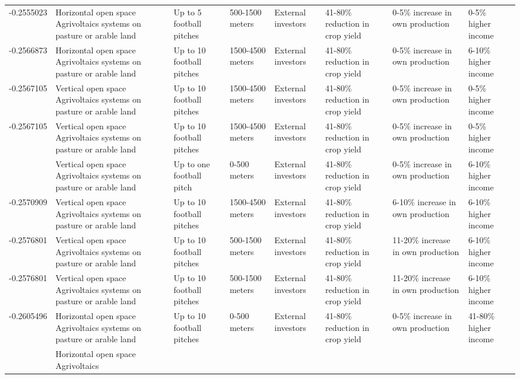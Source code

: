 \begin{table}
\begin{tabular}[t]{rlllllll}
-0.2555023 & Horizontal open space Agrivoltaics
systems on pasture or arable land & Up to 5 football pitches & 500-1500 meters & External investors & 41-80\% reduction in crop yield & 0-5\% increase in own production & 0-5\% higher income\\
-0.2566873 & Horizontal open space Agrivoltaics
systems on pasture or arable land & Up to 10 football pitches & 1500-4500 meters & External investors & 41-80\% reduction in crop yield & 0-5\% increase in own production & 6-10\% higher income\\
-0.2567105 & Vertical open space Agrivoltaics
systems on pasture or arable land & Up to 10 football pitches & 1500-4500 meters & External investors & 41-80\% reduction in crop yield & 0-5\% increase in own production & 0-5\% higher income\\
-0.2567105 & Vertical open space Agrivoltaics
systems on pasture or arable land & Up to 10 football pitches & 1500-4500 meters & External investors & 41-80\% reduction in crop yield & 0-5\% increase in own production & 0-5\% higher income\\
\addlinespace
-0.2570597 & Vertical open space Agrivoltaics
systems on pasture or arable land & Up to one football pitch & 0-500 meters & External investors & 41-80\% reduction in crop yield & 0-5\% increase in own production & 6-10\% higher income\\
-0.2570909 & Vertical open space Agrivoltaics
systems on pasture or arable land & Up to 10 football pitches & 1500-4500 meters & External investors & 41-80\% reduction in crop yield & 6-10\% increase in own production & 6-10\% higher income\\
-0.2576801 & Vertical open space Agrivoltaics
systems on pasture or arable land & Up to 10 football pitches & 500-1500 meters & External investors & 41-80\% reduction in crop yield & 11-20\% increase in own production & 6-10\% higher income\\
-0.2576801 & Vertical open space Agrivoltaics
systems on pasture or arable land & Up to 10 football pitches & 500-1500 meters & External investors & 41-80\% reduction in crop yield & 11-20\% increase in own production & 6-10\% higher income\\
-0.2605496 & Horizontal open space Agrivoltaics
systems on pasture or arable land & Up to 10 football pitches & 0-500 meters & External investors & 41-80\% reduction in crop yield & 0-5\% increase in own production & 41-80\% higher income\\
\addlinespace
-0.2608072 & Horizontal open space Agrivoltaics

\end{tabular}
\end{table}
